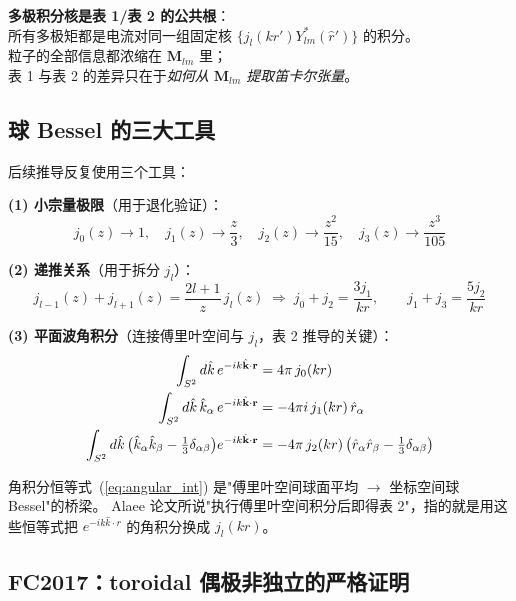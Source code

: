 \begin{nontrivial}
\textbf{多极积分核是表 1/表 2 的公共根}：\\
所有多极矩都是电流对同一组固定核 $\{j_l(kr')Y_{lm}^*(\hat{r}')\}$ 的积分。\\
粒子的全部信息都浓缩在 $\mathbf{M}_{lm}$ 里；\\
表 1 与表 2 的差异只在于\emph{如何从 $\mathbf{M}_{lm}$ 提取笛卡尔张量}。
\end{nontrivial}

\subsection{球 Bessel 的三大工具}

后续推导反复使用三个工具：

\textbf{(1) 小宗量极限}（用于退化验证）：
\begin{equation}
  j_0(z)\to 1,\quad j_1(z)\to\frac{z}{3},\quad
  j_2(z)\to\frac{z^2}{15},\quad j_3(z)\to\frac{z^3}{105}
\end{equation}

\textbf{(2) 递推关系}（用于拆分 $j_l$）：
\begin{equation}
  j_{l-1}(z) + j_{l+1}(z) = \frac{2l+1}{z}\,j_l(z)
  \;\Longrightarrow\;
  j_0 + j_2 = \frac{3j_1}{kr},\qquad
  j_1 + j_3 = \frac{5j_2}{kr}
\end{equation}

\textbf{(3) 平面波角积分}（连接傅里叶空间与 $j_l$，表 2 推导的关键）：
\begin{align}
  \int_{S^2} d\hat{k}\,e^{-ik\hat{\mathbf{k}}\cdot\mathbf{r}} &= 4\pi\,j_0(kr) \notag\\
  \int_{S^2} d\hat{k}\,\hat{k}_\alpha\,e^{-ik\hat{\mathbf{k}}\cdot\mathbf{r}}
    &= -4\pi i\,j_1(kr)\,\hat{r}_\alpha \notag\\
  \int_{S^2} d\hat{k}\,\bigl(\hat{k}_\alpha\hat{k}_\beta - \tfrac13\delta_{\alpha\beta}\bigr)e^{-ik\hat{\mathbf{k}}\cdot\mathbf{r}}
    &= -4\pi\,j_2(kr)\,\bigl(\hat{r}_\alpha\hat{r}_\beta - \tfrac13\delta_{\alpha\beta}\bigr)
  \label{eq:angular_int}
\end{align}

\begin{noteworthy}
角积分恒等式~(\ref{eq:angular_int}) 是"傅里叶空间球面平均 $\to$ 坐标空间球 Bessel"的桥梁。
Alaee 论文所说"执行傅里叶空间积分后即得表 2"，指的就是用这些恒等式把 $e^{-ik\hat{k}\cdot r}$ 的角积分换成 $j_l(kr)$。
\end{noteworthy}

\subsection{FC2017：toroidal 偶极非独立的严格证明}

